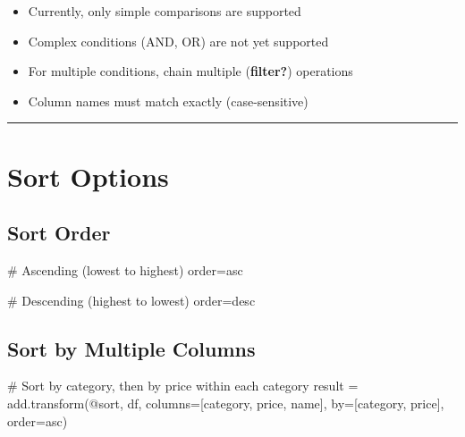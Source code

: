 \documentclass[
  letterpaper,
]{scrbook}
\newenvironment{Shaded}{\begin{snugshade}}{\end{snugshade}}
\newcommand{\CommentTok}[1]{\textcolor[rgb]{0.37,0.37,0.37}{#1}}
\newcommand{\NormalTok}[1]{\textcolor[rgb]{0.00,0.23,0.31}{#1}}
\newcommand{\OperatorTok}[1]{\textcolor[rgb]{0.37,0.37,0.37}{#1}}
\newcommand{\StringTok}[1]{\textcolor[rgb]{0.13,0.47,0.30}{#1}}
\providecommand{\tightlist}{%
  \setlength{\itemsep}{0pt}\setlength{\parskip}{0pt}}
\begin{document}
\begin{itemize}
\tightlist
\item
  Currently, only simple comparisons are supported
\item
  Complex conditions (AND, OR) are not yet supported
\item
  For multiple conditions, chain multiple (\textbf{filter?}) operations
\item
  Column names must match exactly (case-sensitive)
\end{itemize}

\begin{center}\rule{0.5\linewidth}{0.5pt}\end{center}

\section{Sort Options}\label{sort-options}

\subsection{Sort Order}\label{sort-order}

\begin{Shaded}
\begin{Highlighting}[]
\CommentTok{\# Ascending (lowest to highest)}
\NormalTok{order}\OperatorTok{=}\StringTok{\textquotesingle{}asc\textquotesingle{}}

\CommentTok{\# Descending (highest to lowest)}
\NormalTok{order}\OperatorTok{=}\StringTok{\textquotesingle{}desc\textquotesingle{}}
\end{Highlighting}
\end{Shaded}

\subsection{Sort by Multiple Columns}\label{sort-by-multiple-columns}

\begin{Shaded}
\begin{Highlighting}[]
\CommentTok{\# Sort by category, then by price within each category}
\NormalTok{result }\OperatorTok{=}\NormalTok{ add.transform(}\StringTok{\textquotesingle{}@sort\textquotesingle{}}\NormalTok{, df, }
\NormalTok{                       columns}\OperatorTok{=}\NormalTok{[}\StringTok{\textquotesingle{}category\textquotesingle{}}\NormalTok{, }\StringTok{\textquotesingle{}price\textquotesingle{}}\NormalTok{, }\StringTok{\textquotesingle{}name\textquotesingle{}}\NormalTok{],}
\NormalTok{                       by}\OperatorTok{=}\NormalTok{[}\StringTok{\textquotesingle{}category\textquotesingle{}}\NormalTok{, }\StringTok{\textquotesingle{}price\textquotesingle{}}\NormalTok{],}
\NormalTok{                       order}\OperatorTok{=}\StringTok{\textquotesingle{}asc\textquotesingle{}}\NormalTok{)}
\end{Highlighting}
\end{Shaded}
\end{document}
